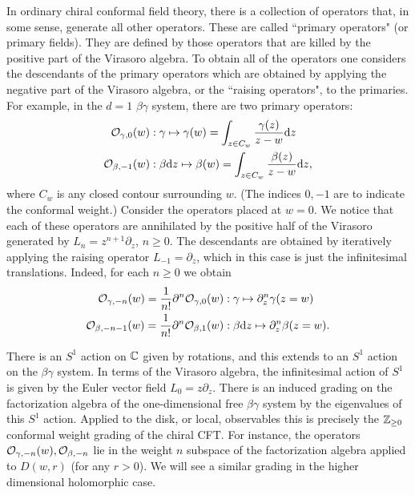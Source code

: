 In ordinary chiral conformal field theory, there is a collection of operators that, in some sense, generate all other operators. 
These are called ``primary operators" (or primary fields).
 They are defined by those operators that are killed by the positive part of the Virasoro algebra.
To obtain all of the operators one considers the descendants of the primary operators which are obtained by applying the negative part of the Virasoro algebra, or the ``raising operators", to the primaries. 
For example, in the $d=1$ $\beta\gamma$ system, there are two primary operators:
\begin{align*}
\mathcal O_{\gamma,0} (w) & : \gamma \mapsto \gamma(w) = \int_{z \in C_w} \frac{\gamma(z)}{z-w} {\rm d} z  \\
\mathcal O_{\beta,-1} (w) & : \beta {\rm d} z \mapsto \beta(w) = \int_{z \in C_w} \frac{\beta(z)}{z-w} {\rm d} z ,
\end{align*}
where $C_w$ is any closed contour surrounding $w$. 
(The indices $0,-1$ are to indicate the conformal weight.)
Consider the operators placed at $w=0$.
We notice that each of these operators are annihilated by the positive half of the Virasoro generated by $L_n = z^{n+1} \partial_z$, $n \geq 0$.
The descendants are obtained by iteratively applying the raising operator $L_{-1} = \partial_z$, which in this case is just the infinitesimal translations. 
Indeed, for each $n \geq 0$ we obtain
\begin{align*}
\mathcal O_{\gamma,-n}(w) = \frac{1}{n!} \partial^n \mathcal O_{\gamma,0}(w) & : \gamma \mapsto \partial_z^n \gamma(z = w) \\
\mathcal O_{\beta,-n-1}(w) = \frac{1}{n!} \partial^n \mathcal O_{\beta,1}(w) & : \beta {\rm d} z \mapsto \partial_z^n \beta(z=w) .
\end{align*}

There is an $S^1$ action on $\mathbb C$ given by rotations, and this extends to an $S^1$ action on the $\beta\gamma$ system.
In terms of the Virasoro algebra, the infinitesimal action of $S^1$ is given by the Euler vector field $L_0 = z \partial_z$. 
There is an induced grading on the factorization algebra of the one-dimensional free $\beta\gamma$ system by the eigenvalues of this $S^1$ action.
Applied to the disk, or local, observables this is precisely the $\mathbb Z_{\geq 0}$ conformal weight grading of the chiral CFT.
For instance, the operators $\mathcal O_{\gamma,-n}(w), \mathcal O_{\beta, -n}$ lie in the weight $n$ subspace of the factorization algebra applied to $D(w,r)$ (for any $r >0$). 
We will see a similar grading in the higher dimensional holomorphic case.

